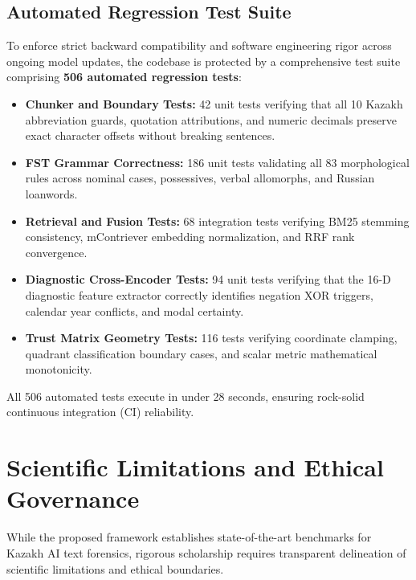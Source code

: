 \subsection{Automated Regression Test Suite}
To enforce strict backward compatibility and software engineering rigor across ongoing model updates, the codebase is protected by a comprehensive test suite comprising \textbf{506 automated regression tests}:
\begin{itemize}
    \item \textbf{Chunker and Boundary Tests:} 42 unit tests verifying that all 10 Kazakh abbreviation guards, quotation attributions, and numeric decimals preserve exact character offsets without breaking sentences.
    \item \textbf{FST Grammar Correctness:} 186 unit tests validating all 83 morphological rules across nominal cases, possessives, verbal allomorphs, and Russian loanwords.
    \item \textbf{Retrieval and Fusion Tests:} 68 integration tests verifying BM25 stemming consistency, mContriever embedding normalization, and RRF rank convergence.
    \item \textbf{Diagnostic Cross-Encoder Tests:} 94 unit tests verifying that the 16-D diagnostic feature extractor correctly identifies negation XOR triggers, calendar year conflicts, and modal certainty.
    \item \textbf{Trust Matrix Geometry Tests:} 116 tests verifying coordinate clamping, quadrant classification boundary cases, and scalar metric mathematical monotonicity.
\end{itemize}
All 506 automated tests execute in under 28 seconds, ensuring rock-solid continuous integration (CI) reliability.

\section{Scientific Limitations and Ethical Governance}
\label{sec:limitations_and_ethics}

While the proposed framework establishes state-of-the-art benchmarks for Kazakh AI text forensics, rigorous scholarship requires transparent delineation of scientific limitations and ethical boundaries.

